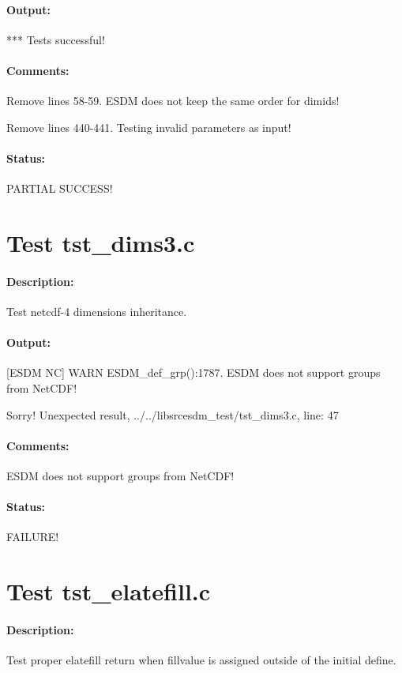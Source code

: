 \paragraph{Output:} *** Tests successful!

\paragraph{Comments:} Remove lines 58-59. ESDM does not keep the same order for dimids!

Remove lines 440-441. Testing invalid parameters as input!

\paragraph{Status:} PARTIAL SUCCESS!

\section{Test tst\_dims3.c}

\paragraph{Description:} Test netcdf-4 dimensions inheritance.

\paragraph{Output:} [ESDM NC] WARN ESDM\_def\_grp():1787. ESDM does not support groups from NetCDF!

Sorry! Unexpected result, ../../libsrcesdm\_test/tst\_dims3.c, line: 47

\paragraph{Comments:} ESDM does not support groups from NetCDF!

\paragraph{Status:} FAILURE!

\section{Test tst\_elatefill.c}

\paragraph{Description:} Test proper elatefill return when fillvalue is assigned outside of
the initial define.

